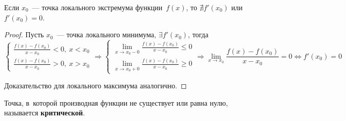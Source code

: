 \begin{theorem}
Если $x_0$~--- точка локального экстремума функции~$f(x)$, то $\nexists f'(x_0)$ или $f'(x_0) = 0$.
\end{theorem}
\begin{proof}
Пусть $x_0$~--- точка локального минимума, $\exists f'(x_0)$, тогда
\begin{equation*}
\begin{cases}
\displaystyle \frac{f(x) - f(x_0)}{x - x_0} < 0, \ x < x_0 \\
\displaystyle \frac{f(x) - f(x_0)}{x - x_0} > 0, \ x > x_0
\end{cases} \Rightarrow
\begin{cases}
\displaystyle \lim_{x \to x_0-0} \frac{f(x) - f(x_0)}{x - x_0} \leqslant 0 \\
\displaystyle \lim_{x \to x_0+0} \frac{f(x) - f(x_0)}{x - x_0} \geqslant 0
\end{cases} \Rightarrow
\lim_{x \to x_0} \frac{f(x) - f(x_0)}{x - x_0} = 0 \Leftrightarrow
f'(x_0) = 0
\end{equation*}

Доказательство для локального максимума аналогично.
\end{proof}

 Точка, в~которой производная функции не существует или равна нулю, называется \textbf{критической}.

